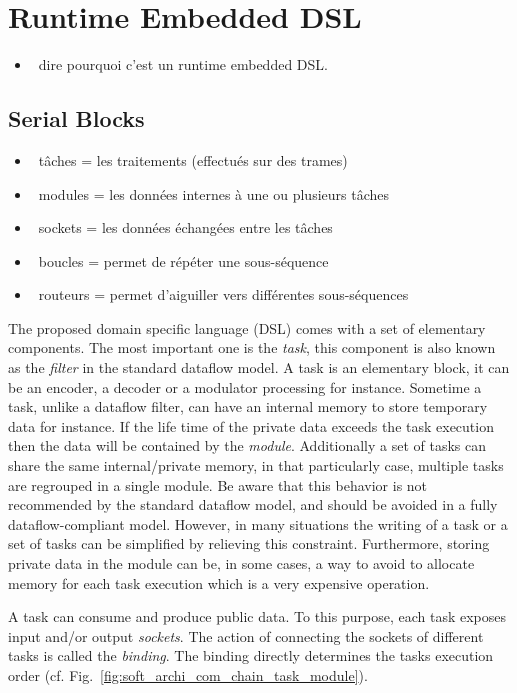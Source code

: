 \section{Runtime Embedded DSL}

\begin{itemize}
  \item \xmark~dire pourquoi c'est un runtime embedded DSL.
\end{itemize}

\subsection{Serial Blocks}

\begin{itemize}
  \item \cmark~tâches = les traitements (effectués sur des trames)
  \item \cmark~modules = les données internes à une ou plusieurs tâches
  \item \cmark~sockets = les données échangées entre les tâches
  \item \cmark~boucles = permet de répéter une sous-séquence
  \item \xmark~routeurs = permet d'aiguiller vers différentes sous-séquences
\end{itemize}

The proposed domain specific language (DSL) comes with a set of elementary
components. The most important one is the \emph{task}, this component is also
known as the \emph{filter} in the standard dataflow model. A task is an
elementary block, it can be an encoder, a decoder or a modulator processing for
instance. Sometime a task, unlike a dataflow filter, can have an internal memory
to store temporary data for instance. If the life time of the private data
exceeds the task execution then the data will be contained by the \emph{module}.
Additionally a set of tasks can share the same internal/private memory, in that
particularly case, multiple tasks are regrouped in a single module. Be aware
that this behavior is not recommended by the standard dataflow model, and should
be avoided in a fully dataflow-compliant model. However, in many situations the
writing of a task or a set of tasks can be simplified by relieving this
constraint. Furthermore, storing private data in the module can be, in some
cases, a way to avoid to allocate memory for each task execution which is a very
expensive operation.

A task can consume and produce public data. To this purpose, each task exposes
input and/or output \emph{sockets}. The action of connecting the sockets of
different tasks is called the \emph{binding}. The binding directly determines
the tasks execution order (cf. Fig.~\ref{fig:soft_archi_com_chain_task_module}).

